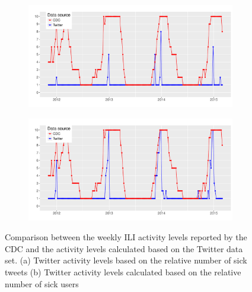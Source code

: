 \documentclass[11pt, a4paper,twoside]{report}\usepackage[]{graphicx}\usepackage[]{color}
\begin{document}
\begin{figure}[H]
\centering
  \begin{subfigure}[t]{1\textwidth}
  \includegraphics[width=1\linewidth]{34_cdc_twitter_comp_nat_activity_sick.pdf}
    \caption{}
  \label{fig:cdc_tw_comp_nat_ac_sick}
  \end{subfigure}
  
  \begin{subfigure}[t]{1\textwidth}
  \includegraphics[width=1\linewidth]{35_cdc_twitter_comp_nat_activity_sick_user.pdf}
    \caption{}
  \label{fig:cdc_tw_comp_nat_ac_sick_user}
  \end{subfigure}
  
  \caption{Comparison between the weekly ILI activity levels reported by the CDC and the activity levels calculated based on the Twitter data set. (a) Twitter activity levels based on the relative number of sick tweets (b) Twitter activity levels calculated based on the relative number of sick users}
\end{figure}
\end{document}
